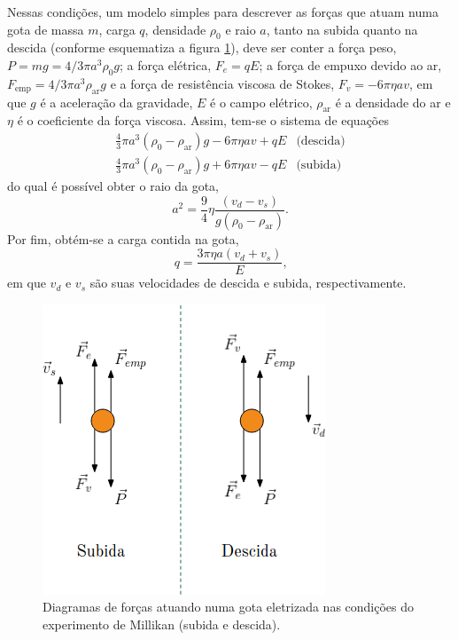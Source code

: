 \documentclass[twoside, twocolumn]{article}
\begin{document}
Nessas condições, um modelo simples para descrever as forças que atuam numa gota de massa $m$, carga $q$, densidade $\rho_0$ e raio $a$, tanto na subida quanto na descida (conforme esquematiza a figura \ref{fig:forcas}), deve ser conter a força peso, $P = m g = 4 / 3 \pi a^3 \rho_0 g$; a força elétrica, $F_e = q E$; a força de empuxo devido ao ar, $F_{\text{emp}} = 4 / 3 \pi a^3 \rho_{\text{ar}} g$ e a força de resistência viscosa de Stokes, $F_v = - 6 \pi \eta a v$, em que $g$ é a aceleração da gravidade, $E$ é o campo elétrico, $\rho_{\text{ar}}$ é a densidade do ar e $\eta$ é o coeficiente da força viscosa. Assim, tem-se o sistema de equações
\begin{equation}
  \begin{array}{ll}\label{eq:forcas}
      \frac{4}{3} \pi a^3 (\rho_0 - \rho_{\text{ar}}) g - 6 \pi \eta a v + q E & \text{(descida)}\\
      \frac{4}{3} \pi a^3 (\rho_0 - \rho_{\text{ar}}) g + 6 \pi \eta a v - q E & \text{(subida)}
  \end{array}
\end{equation}
do qual é possível obter o raio da gota,
\begin{equation}\label{eq:raio}
	a^2 = \frac{9}{4} \eta \frac{(v_d - v_s)}{g (\rho_0 - \rho_{\text{ar}})}\text{.}
\end{equation}
Por fim, obtém-se a carga contida na gota,
\begin{equation}\label{eq:carga}
	q = \frac{3 \pi \eta a (v_d + v_s)}{E}\text{,}
\end{equation}
em que $v_d$ e $v_s$ são suas velocidades de descida e subida, respectivamente.
\begin{figure}[h]
	\centering
	\includegraphics[width = 0.7\linewidth]{forcas-cargas.png}
    \caption{Diagramas de forças atuando numa gota eletrizada nas condições do experimento de Millikan (subida e descida).}
    \label{fig:forcas}
\end{figure}
\end{document}
